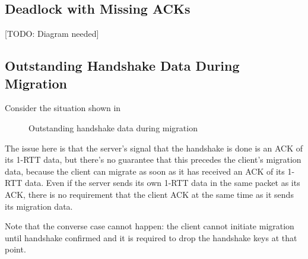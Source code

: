 \documentclass{article}
\begin{document}
\subsection{Deadlock with Missing ACKs}
\label{sec:deadl-with-miss}

[TODO: Diagram needed]

\subsection{Outstanding Handshake Data During Migration}
\label{sec:outst-handsh-data}

Consider the situation shown in 
\begin{figure}[H]
\begin{center}
\end{center}
\caption{Outstanding handshake data during migration}
\label{fig:outstanding-handshake-migration}
\end{figure}

The issue here is that the server's signal that the handshake
is done is an ACK of its 1-RTT data, but there's no guarantee
that this precedes the client's migration data, because the
client can migrate as soon as it has received an ACK of its
1-RTT data. Even if the server sends its own 1-RTT data in
the same packet as its ACK, there is no requirement that
the client ACK at the same time as it sends its migration
data.

Note that the converse case cannot happen: the client cannot
initiate migration until handshake confirmed and it is required
to drop the handshake keys at that point.
\end{document}
